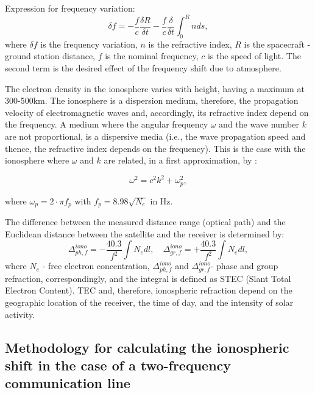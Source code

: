 \documentclass[a4paper,english,bopenany]{article}
\begin{document}
Expression for frequency variation:
 \begin{equation}
 \delta f = -\frac{f}{c}\frac{\delta R}{\delta t}	- \frac{f}{c}\frac{\delta}{\delta t}	\int_{0}^{R}nds, 			
 \end{equation}			
 where $ \delta f $ is the frequency variation, $ n $ is the refractive index, $ R $ is the spacecraft - ground station distance, $ f $ is the nominal frequency, $ c $ is the speed of light. The second term is the desired effect of the frequency shift due to atmosphere.
 


The electron density in the ionosphere varies with height, having a maximum at 300-500km. The ionosphere is a dispersion medium, therefore, the propagation velocity of electromagnetic waves and, accordingly, its refractive index depend on the frequency. A medium where the angular frequency $\omega$  and the wave number $ k $ are not proportional, is a dispersive media (i.e., the wave propagation speed and thence, the refractive index depends on the frequency). This is the case with the ionosphere where $\omega$ and $k$ are related, in a first approximation, by \cite{Crawford}:

\begin{equation}
\omega^{2} = c^{2} k^{2} + \omega_{p}^{2}, 
\end{equation}

where $\omega_{p} = 2\cdot\pi f_p$ with $f_p = 8.98\sqrt{N_e}$ in Hz.

The difference between the measured distance range (optical path) and the Euclidean distance between the satellite and the receiver is determined by:
\begin{equation}\label{Delta_ph_gr}
\Delta^{iono}_{ph,f} = -\frac{40.3}{f^{2}}\int N_{e}dl, \quad \Delta^{iono}_{gr,f} = +\frac{40.3}{f^{2}}\int N_{e}dl,
\end{equation}
where $N_e$ - free electron concentration, $\Delta^{iono}_{ph,f}$ and $\Delta^{iono}_{gr,f}$- phase and group refraction, correspondingly, and the integral is defined as STEC (Slant Total Electron Content). 
TEC and, therefore, ionospheric refraction depend on the geographic location of the receiver, the time of day, and the intensity of solar activity.



\subsection{Methodology for calculating the ionospheric shift in the case of a two-frequency communication line}
\end{document}
